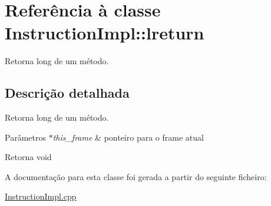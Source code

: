 \hypertarget{class_instruction_impl_1_1lreturn}{}\section{Referência à classe Instruction\+Impl\+:\+:lreturn}
\label{class_instruction_impl_1_1lreturn}


Retorna long de um método.  




\subsection{Descrição detalhada}
Retorna long de um método. 


\begin{DoxyParams}{Parâmetros}
{\em $\ast$this\+\_\+frame} & ponteiro para o frame atual \\
\hline
\end{DoxyParams}
\begin{DoxyReturn}{Retorna}
void 
\end{DoxyReturn}


A documentação para esta classe foi gerada a partir do seguinte ficheiro\+:\begin{DoxyCompactItemize}
\item 
\hyperlink{_instruction_impl_8cpp}{Instruction\+Impl.\+cpp}\end{DoxyCompactItemize}
